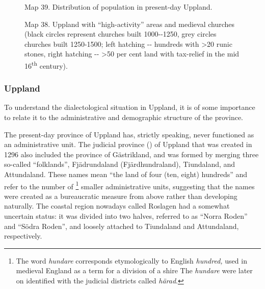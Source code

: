 \begin{figure}[h]
\centering
\begin{minipage}{2.64583in}
\label{bkm:Ref151801116}Map 39. Distribution of population in present-day Uppland.
\end{minipage}
\end{figure}
\begin{figure}[h]
\centering
\begin{minipage}{4.96875in}
\label{bkm:Ref130722360}Map 38. Uppland with “high-activity” areas  and medieval churches (black circles represent churches built 1000-{}-1250, grey circles churches built 1250-1500; left hatching  {}-{}- hundreds with {\textgreater}20 runic stones, right hatching  {}-{}- {\textgreater}50 per cent land with tax-relief in the mid 16\textsuperscript{th} century).
\end{minipage}
\end{figure}
\clearpage\subsubsection[Uppland]{\rmfamily Uppland}
To understand the dialectological situation in Uppland, it is of some importance to relate it to the administrative and demographic structure of the province.

The present-day province of Uppland has, strictly speaking, never functioned as an administrative unit. The judicial province () of Uppland that was created in 1296 also included the province of Gästrikland, and was formed by merging three so-called “folklands”, Fjädrundaland (Fjärdhundraland), Tiundaland, and Attundaland. These names mean “the land of four (ten, eight) hundreds” and refer to the number of \textstyleLinguisticExample{,}\footnote{ The word \textit{hundare} corresponds etymologically to English \textit{hundred}\textit{,} used in medieval England as a term for a division of a shire The \textit{hundare} were later on identified with the judicial districts called \textit{härad}.} smaller administrative units, suggesting that the names were created as a bureaucratic measure from above rather than developing naturally. The coastal region nowadays called Roslagen had a somewhat uncertain status: it was divided into two halves, referred to as “Norra Roden” and “Södra Roden”, and loosely attached to Tiundaland and Attundaland, respectively. 

